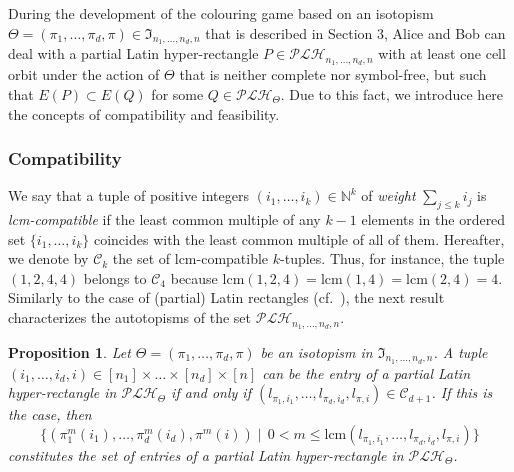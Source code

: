 \documentclass{article}
\newtheorem{prop}[thm]{Proposition}
\begin{document}
\vspace{0.5cm}

During the development of the colouring game based on an isotopism $\Theta=(\pi_1,\ldots,\pi_d,\pi)\in\mathfrak{I}_{n_1,\ldots,n_d,n}$ that is described in Section 3, Alice and Bob can deal with a partial Latin hyper-rectangle $P\in \mathcal{PLH}_{n_1,\ldots,n_d,n}$ with at least one cell orbit under the action of $\Theta$ that is neither complete nor symbol-free, but such that $E(P)\subset E(Q)$ for some $Q\in \mathcal{PLH}_{\Theta}$. Due to this fact, we introduce here the concepts of compatibility and feasibility.

\subsubsection{Compatibility}

We say that a tuple of positive integers $(i_1,\ldots,i_k)\in\mathbb{N}^k$ of {\em weight} $\sum_{j\leq k}i_j$ is {\em lcm-compatible} if the least common multiple of any $k-1$ 
elements in the ordered set $\{i_1,\ldots,i_k\}$ coincides with the least common multiple of all of them. Hereafter, we denote by $\mathcal{C}_k$ the set of lcm-compatible $k$-tuples. 
Thus, for instance, the tuple $(1,2,4,4)$ belongs to $\mathcal{C}_4$ because $\mathrm{lcm}(1,2,4)=\mathrm{lcm}(1,4)=\mathrm{lcm}(2,4)=4$. Similarly to the case of (partial) Latin 
rectangles (cf.~\cite{Falcon2013, Falcon2015, Stones2012}), the next result characterizes the autotopisms of the set $\mathcal{PLH}_{n_1,\ldots,n_d,n}$.

\pagebreak[3]

\begin{prop}\label{prop_PLH_0} Let $\Theta=(\pi_1,\ldots,\pi_d,\pi)$ be an isotopism in $\mathfrak{I}_{n_1,\ldots,n_d,n}$. A tuple $(i_1,\ldots,i_d,i)\in [n_1]\times\ldots\times 
[n_d]\times [n]$ can be the entry of a partial Latin hyper-rectangle in $\mathcal{PLH}_{\Theta}$ if and only if $(l_{\pi_1,i_1},\ldots,l_{\pi_d,i_d},l_{\pi,i}) \in\mathcal{C}_{d+1}$. 
If this is the case, then 
\[\{(\pi_1^m(i_1),\ldots,\pi_d^m(i_d),\pi^m(i))\mid\, 0<m\leq \mathrm{lcm}(l_{\pi_1,i_1},\ldots,l_{\pi_d,i_d},l_{\pi,i})\}\] 
constitutes the set of entries of a partial Latin 
hyper-rectangle in $\mathcal{PLH}_{\Theta}$.
\end{prop}
\end{document}
